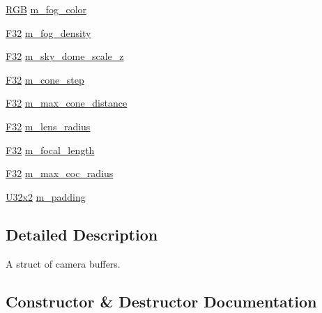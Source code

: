 \begin{DoxyCompactItemize}
\mbox{\hyperlink{structmage_1_1_r_g_b}{R\+GB}} \mbox{\hyperlink{structmage_1_1rendering_1_1_camera_buffer_a6f963e7d607c59ab0dfc3972e06a9739}{m\+\_\+fog\+\_\+color}}
\item 
\mbox{\hyperlink{namespacemage_aa97e833b45f06d60a0a9c4fc22ae02c0}{F32}} \mbox{\hyperlink{structmage_1_1rendering_1_1_camera_buffer_aa9c3a305adfbeb717d480e822ed1c77e}{m\+\_\+fog\+\_\+density}}
\item 
\mbox{\hyperlink{namespacemage_aa97e833b45f06d60a0a9c4fc22ae02c0}{F32}} \mbox{\hyperlink{structmage_1_1rendering_1_1_camera_buffer_abfb4dbb9a228b6a7412b09b179fd157d}{m\+\_\+sky\+\_\+dome\+\_\+scale\+\_\+z}}
\item 
\mbox{\hyperlink{namespacemage_aa97e833b45f06d60a0a9c4fc22ae02c0}{F32}} \mbox{\hyperlink{structmage_1_1rendering_1_1_camera_buffer_a5c52e867f42818ca71cbc7d593d49adf}{m\+\_\+cone\+\_\+step}}
\item 
\mbox{\hyperlink{namespacemage_aa97e833b45f06d60a0a9c4fc22ae02c0}{F32}} \mbox{\hyperlink{structmage_1_1rendering_1_1_camera_buffer_a99515c320feafb88a2d2fdf24520975d}{m\+\_\+max\+\_\+cone\+\_\+distance}}
\item 
\mbox{\hyperlink{namespacemage_aa97e833b45f06d60a0a9c4fc22ae02c0}{F32}} \mbox{\hyperlink{structmage_1_1rendering_1_1_camera_buffer_a7915bec843e03ad2248c08b10317ccc7}{m\+\_\+lens\+\_\+radius}}
\item 
\mbox{\hyperlink{namespacemage_aa97e833b45f06d60a0a9c4fc22ae02c0}{F32}} \mbox{\hyperlink{structmage_1_1rendering_1_1_camera_buffer_a7ed5079582d476597f8bc4d6a0b3f372}{m\+\_\+focal\+\_\+length}}
\item 
\mbox{\hyperlink{namespacemage_aa97e833b45f06d60a0a9c4fc22ae02c0}{F32}} \mbox{\hyperlink{structmage_1_1rendering_1_1_camera_buffer_a3273510e0a7bbdd9481fe67f9e223f59}{m\+\_\+max\+\_\+coc\+\_\+radius}}
\item 
\mbox{\hyperlink{namespacemage_a31f2bb52b5080e706e1c13de07c0a249}{U32x2}} \mbox{\hyperlink{structmage_1_1rendering_1_1_camera_buffer_ac3d41b35c2d2fc4174841f78d3b05a0d}{m\+\_\+padding}}
\end{DoxyCompactItemize}


\subsection{Detailed Description}
A struct of camera buffers. 

\subsection{Constructor \& Destructor Documentation}
\mbox{\label{structmage_1_1rendering_1_1_camera_buffer_a751c2923a5deb710d7c3957f04c89fcf}} 
